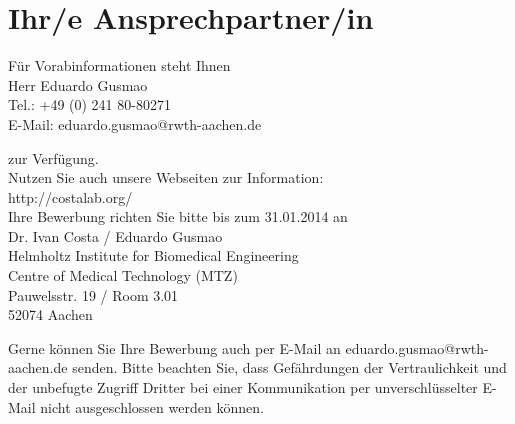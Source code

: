 \documentclass[11pt]{article}
\begin{document}
\section{Ihr/e Ansprechpartner/in}
\label{sec:ansprechpartner}

F{\"u}r Vorabinformationen steht Ihnen \\
Herr Eduardo Gusmao \\
Tel.: +49 (0) 241 80-80271 \\
E-Mail: eduardo.gusmao@rwth-aachen.de

\noindent
zur Verf{\"u}gung. \\
Nutzen Sie auch unsere Webseiten zur Information: \\
http://costalab.org/ \\

\noindent
Ihre Bewerbung richten Sie bitte bis zum 31.01.2014 an \\
Dr. Ivan Costa / Eduardo Gusmao \\
Helmholtz Institute for Biomedical Engineering \\
Centre of Medical Technology (MTZ) \\
Pauwelsstr. 19 / Room 3.01\\
52074 Aachen

\noindent
Gerne k{\"o}nnen Sie Ihre Bewerbung auch per E-Mail an eduardo.gusmao@rwth-aachen.de senden. Bitte beachten Sie, dass Gef{\"a}hrdungen der Vertraulichkeit und der unbefugte Zugriff Dritter bei einer Kommunikation per unverschl{\"u}sselter E-Mail nicht ausgeschlossen werden k{\"o}nnen.



\end{document}
